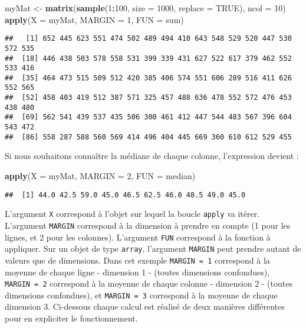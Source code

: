 \documentclass[]{book}
\newenvironment{Shaded}{\begin{snugshade}}{\end{snugshade}}
\newcommand{\KeywordTok}[1]{\textcolor[rgb]{0.13,0.29,0.53}{\textbf{#1}}}
\newcommand{\DataTypeTok}[1]{\textcolor[rgb]{0.13,0.29,0.53}{#1}}
\newcommand{\DecValTok}[1]{\textcolor[rgb]{0.00,0.00,0.81}{#1}}
\newcommand{\StringTok}[1]{\textcolor[rgb]{0.31,0.60,0.02}{#1}}
\newcommand{\OtherTok}[1]{\textcolor[rgb]{0.56,0.35,0.01}{#1}}
\newcommand{\OperatorTok}[1]{\textcolor[rgb]{0.81,0.36,0.00}{\textbf{#1}}}
\newcommand{\NormalTok}[1]{#1}
\theoremstyle{definition}
\theoremstyle{definition}
\theoremstyle{definition}
\theoremstyle{remark}
\begin{document}
\begin{Shaded}
\begin{Highlighting}[]
\NormalTok{myMat <-}\StringTok{ }\KeywordTok{matrix}\NormalTok{(}\KeywordTok{sample}\NormalTok{(}\DecValTok{1}\OperatorTok{:}\DecValTok{100}\NormalTok{, }\DataTypeTok{size =} \DecValTok{1000}\NormalTok{, }\DataTypeTok{replace =} \OtherTok{TRUE}\NormalTok{), }\DataTypeTok{ncol =} \DecValTok{10}\NormalTok{)}
\KeywordTok{apply}\NormalTok{(}\DataTypeTok{X =}\NormalTok{ myMat, }\DataTypeTok{MARGIN =} \DecValTok{1}\NormalTok{, }\DataTypeTok{FUN =}\NormalTok{ sum)}
\end{Highlighting}
\end{Shaded}

\begin{verbatim}
##   [1] 652 445 623 551 474 502 489 494 410 643 548 529 520 447 530 572 535
##  [18] 446 438 503 578 558 531 399 339 431 627 522 617 379 462 552 533 416
##  [35] 464 473 515 509 512 420 385 406 574 551 606 289 516 411 626 552 565
##  [52] 458 403 419 512 387 571 325 457 488 636 478 552 572 476 453 438 480
##  [69] 562 541 439 537 435 506 300 461 412 447 544 483 567 396 604 543 472
##  [86] 558 287 588 560 569 414 496 404 445 669 360 610 612 529 455
\end{verbatim}

Si nous souhaitons connaître la médiane de chaque colonne, l'expression
devient :

\begin{Shaded}
\begin{Highlighting}[]
\KeywordTok{apply}\NormalTok{(}\DataTypeTok{X =}\NormalTok{ myMat, }\DataTypeTok{MARGIN =} \DecValTok{2}\NormalTok{, }\DataTypeTok{FUN =}\NormalTok{ median)}
\end{Highlighting}
\end{Shaded}

\begin{verbatim}
##  [1] 44.0 42.5 59.0 45.0 46.5 62.5 46.0 48.5 49.0 45.0
\end{verbatim}

L'argument \texttt{X} correspond à l'objet sur lequel la boucle
\texttt{apply} va itérer. L'argument \texttt{MARGIN} correspond à la
dimension à prendre en compte (1 pour les lignes, et 2 pour les
colonnes). L'argument \texttt{FUN} correspond à la fonction à appliquer.
Sur un objet de type \texttt{array}, l'argument \texttt{MARGIN} peut
prendre autant de valeurs que de dimensions. Dans cet exemple
\texttt{MARGIN\ =\ 1} correspond à la moyenne de chaque ligne -
dimension 1 - (toutes dimensions confondues), \texttt{MARGIN\ =\ 2}
correspond à la moyenne de chaque colonne - dimension 2 - (toutes
dimensions confondues), et \texttt{MARGIN\ =\ 3} correspond à la moyenne
de chaque dimension 3. Ci-dessous chaque calcul est réalisé de deux
manières différentes pour en expliciter le fonctionnement.
\end{document}
